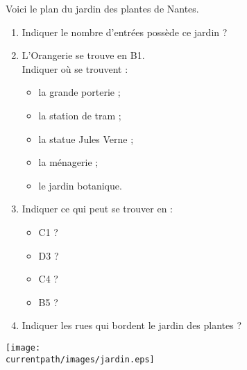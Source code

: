 \begin{exercice}
    Voici le plan du jardin des plantes de Nantes. \\
   \begin{minipage}{7cm}
       \begin{enumerate}
          \item Indiquer le nombre d'entrées possède ce jardin ?
          \item L'Orangerie se trouve en B1. \\
          Indiquer où se trouvent :
          \begin{itemize}
             \item la grande porterie ;
             \item la station de tram ;
             \item la statue Jules Verne ;
             \item la ménagerie ;
             \item le jardin botanique.
          \end{itemize}
          \item Indiquer ce qui peut se trouver en :
          \begin{itemize}
             \item C1 ?
             \item D3 ?
             \item C4 ?
             \item B5 ?
          \end{itemize}
          \item Indiquer les rues qui bordent le jardin des plantes ?
       \end{enumerate}
    \end{minipage}
    \qquad
    \begin{minipage}{9.5cm}
       \texttt{[image: \\currentpath/images/jardin.eps]}
    \end{minipage}
    \qquad
 \end{exercice}